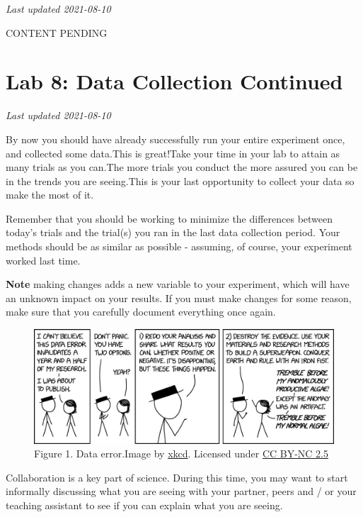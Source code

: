 \documentclass[
]{book}
\begin{document}
\emph{Last updated 2021-08-10}

CONTENT PENDING

\hypertarget{lab-8-data-collection-continued}{%
\chapter*{Lab 8: Data Collection Continued}\label{lab-8-data-collection-continued}}

\emph{Last updated 2021-08-10}

By now you should have already successfully run your entire experiment once, and collected some data.This is great!Take your time in your lab to attain as many trials as you can.The more trials you conduct the more assured you can be in the trends you are seeing.This is your last opportunity to collect your data so make the most of it.

Remember that you should be working to minimize the differences between today's trials and the trial(s) you ran in the last data collection period. Your methods should be as similar as possible - assuming, of course, your experiment worked last time.

\textbf{Note} making changes adds a new variable to your experiment, which will have an unknown impact on your results. If you must make changes for some reason, make sure that you carefully document everything once again.

\begin{figure}
\centering
\includegraphics{figures_images/Lab8-Fig1.png}
\caption{Figure 1. Data error.Image by \href{https://xkcd.com/2239/}{xkcd}. Licensed under \href{https://creativecommons.org/licenses/by-nc/2.5/}{CC BY-NC 2.5}}
\end{figure}

Collaboration is a key part of science. During this time, you may want to start informally discussing what you are seeing with your partner, peers and / or your teaching assistant to see if you can explain what you are seeing.
\end{document}
